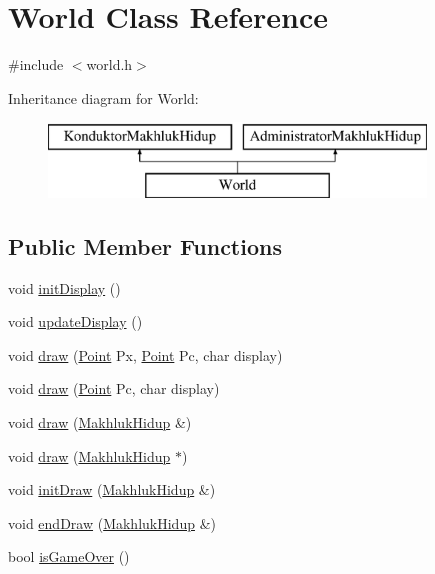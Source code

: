 \hypertarget{class_world}{}\section{World Class Reference}
\label{class_world}


{\ttfamily \#include $<$world.\+h$>$}

Inheritance diagram for World\+:\begin{figure}[H]
\begin{center}
\leavevmode
\includegraphics[height=2.000000cm]{class_world}
\end{center}
\end{figure}
\subsection*{Public Member Functions}
\begin{DoxyCompactItemize}
\item 
void \hyperlink{class_world_a3ccab52e143cc85200d3d4a5384c4559}{init\+Display} ()
\item 
void \hyperlink{class_world_a0656cc8aa64881db8880d6a1af0d5aea}{update\+Display} ()
\item 
void \hyperlink{class_world_a4b86052df7db7bb46cca3e195c8bf898}{draw} (\hyperlink{class_point}{Point} Px, \hyperlink{class_point}{Point} Pc, char display)
\item 
void \hyperlink{class_world_ae08f8491c85c42b9951fa51b1b859fa7}{draw} (\hyperlink{class_point}{Point} Pc, char display)
\item 
void \hyperlink{class_world_abb9e5b837315e20d4cdca5b154b9730d}{draw} (\hyperlink{class_makhluk_hidup}{Makhluk\+Hidup} \&)
\item 
void \hyperlink{class_world_ad1e2e50d7734e8e86c45a2e94d8a3a7c}{draw} (\hyperlink{class_makhluk_hidup}{Makhluk\+Hidup} $\ast$)
\item 
void \hyperlink{class_world_a90d88a70e0db9152a75fda712cf7dd43}{init\+Draw} (\hyperlink{class_makhluk_hidup}{Makhluk\+Hidup} \&)
\item 
void \hyperlink{class_world_ab11226032a384c6afedc09b28664a7fc}{end\+Draw} (\hyperlink{class_makhluk_hidup}{Makhluk\+Hidup} \&)
\item 
bool \hyperlink{class_world_a461cec44996dcc3cfd000d7985647c8b}{is\+Game\+Over} ()
\end{DoxyCompactItemize}


